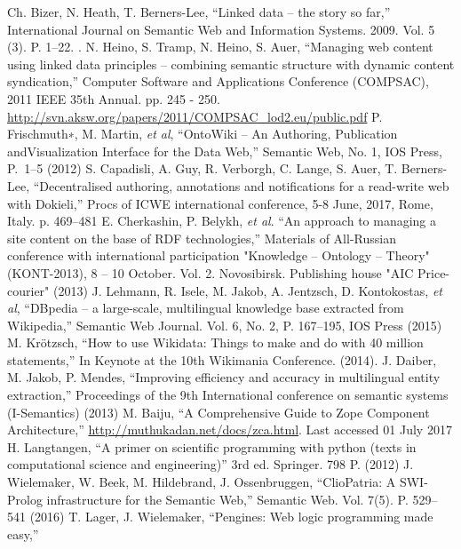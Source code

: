 \documentclass[
]{ceurart}
\begin{document}
\begin{thebibliography}{99}
 Ch. Bizer, N. Heath, T. Berners-Lee, ``Linked data -- the story so
  far,'' International Journal on Semantic Web and Information Systems.
  2009. Vol. 5 (3). P. 1--22. .
 N. Heino, S. Tramp, N. Heino, S. Auer, ``Managing web content using linked data principles – combining semantic structure with dynamic content syndication,'' Computer Software and Applications Conference (COMPSAC), 2011 IEEE 35th Annual. pp. 245 - 250.  \url{http://svn.aksw.org/papers/2011/COMPSAC_lod2.eu/public.pdf}
 P. Frischmuth∗, M. Martin, \textit{et al}, ``OntoWiki – An Authoring, Publication andVisualization Interface for the Data Web,'' Semantic Web, No. 1, IOS Press, P.~1--5 (2012)
  S. Capadisli, A. Guy, R. Verborgh, C. Lange, S. Auer, T. Berners-Lee, ``Decentralised authoring, annotations and notifications for a read-write web with Dokieli,'' Procs of ICWE international conference, 5-8 June, 2017, Rome, Italy. p. 469--481 
  E. Cherkashin, P. Belykh, \textit{et al}. ``An approach to managing a site
  content on the base of RDF technologies,'' Materials of All-Russian
  conference with international participation "Knowledge -- Ontology --
  Theory" (KONT-2013), 8 -- 10 October. Vol. 2. Novosibirsk.
  Publishing house "AIC Price-courier" (2013)
  J. Lehmann, R. Isele, M. Jakob, A. Jentzsch, D. Kontokostas, \textit{et al},
  ``DBpedia -- a large-scale, multilingual knowledge base extracted from
  Wikipedia,'' Semantic Web Journal. Vol. 6, No. 2, P. 167--195,
  IOS Press (2015)
  M. Krötzsch, ``How to use Wikidata: Things to make and do with 40 million
  statements,'' In Keynote at the 10th Wikimania Conference. (2014).
  J. Daiber, M. Jakob, P. Mendes, ``Improving efficiency and accuracy in
  multilingual entity extraction,'' Proceedings of the 9th International
  conference on semantic systems (I-Semantics) (2013)
  M. Baiju, ``A Comprehensive Guide to Zope Component Architecture,''
\url{http://muthukadan.net/docs/zca.html}. Last accessed 01 July 2017
  H. Langtangen, ``A primer on scientific programming with python (texts in
  computational science and engineering)'' 3rd ed. Springer. 798 P. (2012)
  J. Wielemaker, W. Beek, M. Hildebrand, J. Ossenbruggen, ``ClioPatria: A
  SWI-Prolog infrastructure for the Semantic Web,'' Semantic Web.
  Vol. 7(5). P. 529--541 (2016) 
  T. Lager, J. Wielemaker, ``Pengines: Web logic programming made easy,''

\end{thebibliography}
\end{document}
